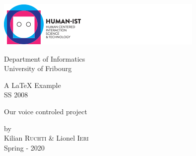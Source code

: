 
\begin{titlepage} 
	\begin{center}
		
		\includegraphics[scale=.6]{Report/images/human-ist.png}\\
		
		\vspace{0.5cm}
		
		Department of Informatics\\
		University of Fribourg\\

		\vspace{3cm}
		
		\begin{large}
		A \LaTeX{} Example\\
		SS 2008\\
		\end{large}
		
		\vspace{3cm}
		
		\begin{huge}
			{\sf Our voice controled project}
		\end{huge}
		
				
		\vspace{3cm}
		
		\begin{large}
			\vspace{1cm}
			 by\\
			 Kilian \textsc{Ruchti} & Lionel \textsc{Ieri}\\
			\vspace{0.2cm}
			Spring - 2020
		\end{large}
				
	\end{center}
\end{titlepage}
